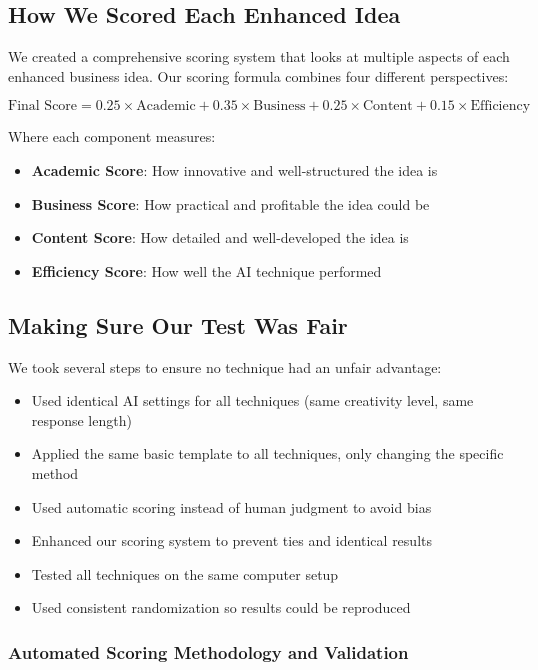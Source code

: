 \documentclass[12pt]{article}
\begin{document}
\subsection{How We Scored Each Enhanced Idea}

We created a comprehensive scoring system that looks at multiple aspects of each enhanced business idea. Our scoring formula combines four different perspectives:

\begin{equation}
\text{Final Score} = 0.25 \times \text{Academic} + 0.35 \times \text{Business} + 0.25 \times \text{Content} + 0.15 \times \text{Efficiency}
\end{equation}

Where each component measures:
\begin{itemize}
\item \textbf{Academic Score}: How innovative and well-structured the idea is
\item \textbf{Business Score}: How practical and profitable the idea could be
\item \textbf{Content Score}: How detailed and well-developed the idea is
\item \textbf{Efficiency Score}: How well the AI technique performed
\end{itemize}

\subsection{Making Sure Our Test Was Fair}

We took several steps to ensure no technique had an unfair advantage:

\begin{itemize}
\item Used identical AI settings for all techniques (same creativity level, same response length)
\item Applied the same basic template to all techniques, only changing the specific method
\item Used automatic scoring instead of human judgment to avoid bias
\item Enhanced our scoring system to prevent ties and identical results
\item Tested all techniques on the same computer setup
\item Used consistent randomization so results could be reproduced
\end{itemize}

\subsubsection{Automated Scoring Methodology and Validation}
\end{document}
